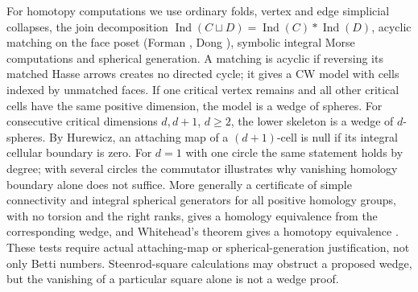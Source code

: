 \documentclass[11pt,a4paper]{article}
\theoremstyle{definition}\newtheorem{definition}[theorem]{Definition}\newtheorem{example}[theorem]{Example}
\theoremstyle{remark}\newtheorem{remark}[theorem]{Remark}
\newcommand{\Ind}{\operatorname{Ind}}
\begin{document}
For homotopy computations we use ordinary folds, vertex and edge simplicial collapses, the join decomposition \(\Ind(C\sqcup D)=\Ind(C)*\Ind(D)\), acyclic matching on the face poset (Forman \cite{forman}, Dong \cite{dong}), symbolic integral Morse computations and spherical generation. A matching is acyclic if reversing its matched Hasse arrows creates no directed cycle; it gives a CW model with cells indexed by unmatched faces. If one critical vertex remains and all other critical cells have the same positive dimension, the model is a wedge of spheres. For consecutive critical dimensions \(d,d+1\), \(d\ge2\), the lower skeleton is a wedge of \(d\)-spheres. By Hurewicz, an attaching map of a \((d+1)\)-cell is null if its integral cellular boundary is zero. For \(d=1\) with one circle the same statement holds by degree; with several circles the commutator illustrates why vanishing homology boundary alone does not suffice. More generally a certificate of simple connectivity and integral spherical generators for all positive homology groups, with no torsion and the right ranks, gives a homology equivalence from the corresponding wedge, and Whitehead's theorem gives a homotopy equivalence \cite{hatcher}. These tests require actual attaching-map or spherical-generation justification, not only Betti numbers. Steenrod-square calculations may obstruct a proposed wedge, but the vanishing of a particular square alone is not a wedge proof.
\end{document}
